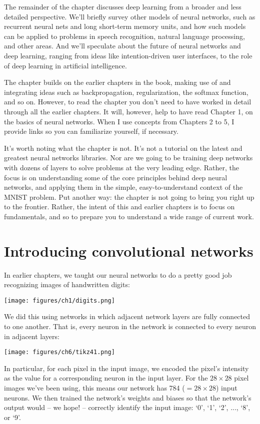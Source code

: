 \documentclass[a4paper,twoside,10pt]{book}
\begin{document}
The remainder of the chapter discusses deep learning from a broader and less detailed perspective. We'll briefly survey other models of neural networks, such as recurrent neural nets and long short-term memory units, and how such models can be applied to problems in speech recognition, natural language processing, and other areas. And we'll speculate about the future of neural networks and deep learning, ranging from ideas like intention-driven user interfaces, to the role of deep learning in artificial intelligence.

The chapter builds on the earlier chapters in the book, making use of and integrating ideas such as backpropagation, regularization, the softmax function, and so on. However, to read the chapter you don't need to have worked in detail through all the earlier chapters. It will, however, help to have read Chapter 1, on the basics of neural networks. When I use concepts from Chapters 2 to 5, I provide links so you can familiarize yourself, if necessary.

It's worth noting what the chapter is not. It's not a tutorial on the latest and greatest neural networks libraries. Nor are we going to be training deep networks with dozens of layers to solve problems at the very leading edge. Rather, the focus is on understanding some of the core principles behind deep neural networks, and applying them in the simple, easy-to-understand context of the MNIST problem. Put another way: the chapter is not going to bring you right up to the frontier. Rather, the intent of this and earlier chapters is to focus on fundamentals, and so to prepare you to understand a wide range of current work.

\section{Introducing convolutional networks}
\label{subseq:cnn}
In earlier chapters, we taught our neural networks to do a pretty good job recognizing images of handwritten digits:
\begin{center}
	\texttt{[image: figures/ch1/digits.png]}
\end{center}
We did this using networks in which adjacent network layers are fully connected to one another. That is, every neuron in the network is connected to every neuron in adjacent layers:
\begin{center}
	\texttt{[image: figures/ch6/tikz41.png]}
\end{center}
In particular, for each pixel in the input image, we encoded the pixel's intensity as the value for a corresponding neuron in the input layer. For the $28\times28$ pixel images we've been using, this means our network has 784 ($=28\times28$) input neurons. We then trained the network's weights and biases so that the network's output would -- we hope! -- correctly identify the input image: `0', `1', `2', ..., `8', or `9'.
\end{document}
